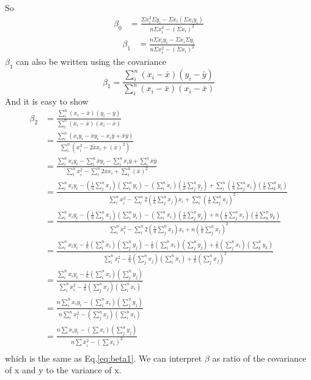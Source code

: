 \documentclass[a4paper]{article}
\begin{document}
So
\begin{align} \label{eq:beta0}
\beta_0 & = \frac{\Sigma x_i^2 \Sigma y_i - \Sigma x_i (\Sigma x_i y_i)}{n\Sigma x^2_i - (\Sigma x_i)^2}
\end{align}
\begin{align} \label{eq:beta1} 
\beta_1 & = \frac{n \Sigma x_i y_i -\Sigma x_i \Sigma y_i }{n\Sigma x^2_i - (\Sigma x_i)^2}
\end{align}
$\beta_1$ can also be written using the covariance
\begin{equation} \label{eq:betacovariance}
\beta_1=\frac{\sum_i^n(x_i-\bar x)(y_i-\bar y)}{\sum_i^n(x_i-\bar x)(x_i-\bar x)}
\end{equation}
And it is easy to show 
\begin{align*}
\beta_2 &=\frac{\sum_i^n(x_i-\bar x)(y_i-\bar y)}{\sum_i^n(x_i-\bar x)(x_i-\bar x)}\\
            &=\frac{\sum_i^n(x_iy_i-\bar x y_i -x_i \bar y + \bar x \bar y)}{\sum_i^n(x_i^2 -2\bar x x_i + (\bar x)^2)}\\
	    &=\frac{\sum_i^n x_iy_i-\sum_i^n \bar x y_i -\sum_i^n x_i \bar y + \sum_i^n \bar x \bar y}{\sum_i^n x_i^2 -\sum_i^n 2\bar x x_i + \sum_i^n (\bar x)^2}\\
           &=\frac{\sum_i^n x_iy_i-(\frac{1}{n}\sum_j^n x_j)(\sum_i^n y_i) -(\sum_i^n x_i)(\frac{1}{n}\sum_j^n y_j) + \sum_i^n (\frac{1}{n}\sum_j^n x_i)(\frac{1}{n}\sum_k^n y_i)}{\sum_i^n x_i^2 -\sum_i^n 2(\frac{1}{n}\sum_j^n x_j) x_i + \sum_i^n (\frac{1}{n}\sum_j^n x_j)^2}\\
 &=\frac{\sum_i^n x_iy_i-(\frac{1}{n}\sum_j^n x_j)(\sum_i^n y_i) -(\sum_i^n x_i)(\frac{1}{n}\sum_j^n y_j) + n (\frac{1}{n}\sum_j^n x_i)(\frac{1}{n}\sum_k^n y_k)}{\sum_i^n x_i^2 -\sum_i^n 2(\frac{1}{n}\sum_j^n x_j) x_i + n(\frac{1}{n}\sum_j^n x_j)^2}\\
&=\frac{\sum_i^n x_iy_i-\frac{1}{n}(\sum_i^n x_i)(\sum_j^n y_j) -\frac{1}{n}(\sum_i^n x_i)(\sum_j^n y_j) +  \frac{1}{n}(\sum_j^n x_i)(\sum_k^n y_k)}{\sum_i^n x_i^2 - \frac{2}{n}(\sum_j^n x_j) (\sum_i^nx_i) + \frac{1}{n}(\sum_j^n x_j)^2}\\
&=\frac{\sum_i^n x_iy_i-\frac{1}{n}(\sum_i^n x_i)(\sum_j^n y_j)}{\sum_i^n x_i^2 - \frac{1}{n}(\sum_j^n x_j) (\sum_i^nx_i) }\\
&=\frac{n\sum_i^n x_iy_i-(\sum_i^n x_i)(\sum_j^n y_j)}{n\sum_i^n x_i^2 - (\sum_j^n x_j) (\sum_i^nx_i) }\\
&=\frac{n\sum x_iy_i-(\sum x_i)(\sum_j^n y_j)}{n\sum x_i^2 - (\sum x_i)^2 }\\
\end{align*}
which is the same as Eq.\ref{eq:beta1}.  We can interpret $\beta$ as ratio of the covariance of x and y to the variance of x.
\end{document}
